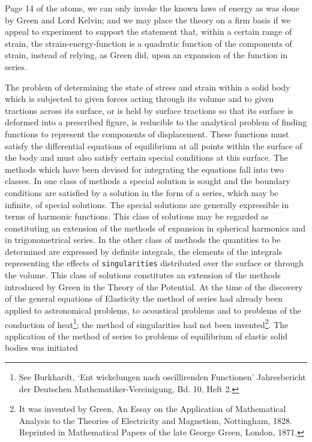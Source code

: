 Page 14 of the atoms, we can only invoke the known laws of energy as was done by
Green and Lord Kelvin; and we may place the theory on a firm basis if we
appeal to experiment to support the statement that, within a certain range
of strain, the strain-energy-function is a quadratic function of the
components of strain, instead of relying, as Green did, upon an expansion
of the function in series.

The problem of determining the state of stress and strain within a solid
body which is subjected to given forces acting through its volume and to
given tractions across its surface, or is held by surface tractions so that its
surface is deformed into a prescribed figure, is reducible to the analytical
problem of finding functions to represent the components of displacement.
These functions must satisfy the differential equations of equilibrium at all
points within the surface of the body and must also satisfy certain special
conditions at this surface. The methods which have been devised for integrating
the equations fall into two classes. In one class of methods a special
solution is sought and the boundary conditions are satisfied by a solution in
the form of a series, which may be infinite, of special solutions. The special
solutions are generally expressible in terms of harmonic functions. This class
of solutions may be regarded as constituting an extension of the methods of
expansion in spherical harmonics and in trigonometrical series. In the other
class of methods the quantities to be determined are expressed by definite
integrals, the elements of the integrals representing the effects of
\texttt{singularities}
distributed over the surface or through the volume. This class of solutions
constitutes an extension of the methods introduced by Green in the Theory
of the Potential. At the time of the discovery of the general equations of
Elasticity the method of series had already been applied to astronomical
problems, to acoustical problems and to problems of the conduction of
heat\footnote{See Burkhardt, `Ent wickelungen nach oscillirenden Functionen'
Jahresbericht der Deutschen Mathematiker-Vereinigung, Bd. 10, Heft 2.};
the method of singularities had not been
invented\footnote{It was invented by Green, An Essay on the Application of
Mathematical Analysis to the Theories of Electricity and Magnetism, Nottingham,
1828. Reprinted in Mathematical Papers of the late George Green, London,
1871.}. The application of the method of series to problems of equilibrium of
elastic solid bodies was initiated
\setcounter{footnote}{38}

